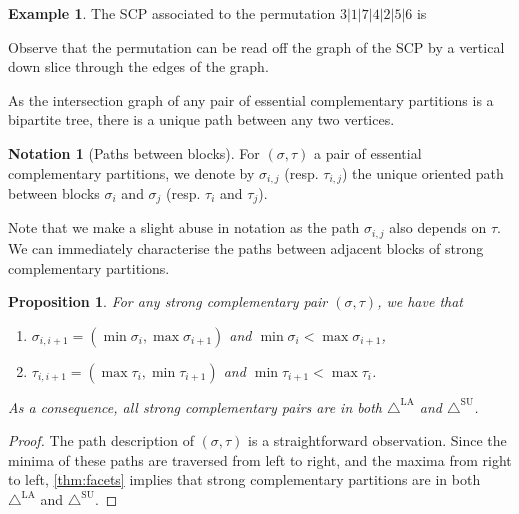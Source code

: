\documentclass{amsart}
\newtheorem{proposition}[theorem]{Proposition}
\theoremstyle{definition}
\newtheorem{example}[theorem]{Example}
\newtheorem{notation}[theorem]{Notation}
\newcommand{\SUD}{\triangle^{\mathrm{SU}}}
\newcommand{\LAD}{\triangle^{\mathrm{LA}}}
\begin{document}
\begin{example}
\label{ex:strong-complementary}
The SCP associated to the permutation $3|1|7|4|2|5|6$ is
\begin{center}
\end{center}
Observe that the permutation can be read off the graph of the SCP by a vertical down slice through the edges of the graph.
\end{example}

As the intersection graph of any pair of essential complementary partitions is a bipartite tree, there is a unique path between any two vertices. 

\begin{notation}[Paths between blocks]
    For $(\sigma,\tau)$ a pair of essential complementary partitions, we denote by $\sigma_{i,j}$ (resp. $\tau_{i,j}$) the unique oriented path between blocks $\sigma_{i}$ and $\sigma_j$ (resp. $\tau_{i}$ and $\tau_j$).
\end{notation}
Note that we make a slight abuse in notation as the path $\sigma_{i,j}$ also depends on $\tau$.
We can immediately characterise the paths between adjacent blocks of strong complementary partitions.

\begin{proposition} 
\label{lem:SCP-path-desc}
For any strong complementary pair $(\sigma,\tau)$, we have that
\begin{enumerate}
    \item $ \sigma_{i,i+1} = ( \min \sigma_i, \max \sigma_{i+1} )$ and $\min \sigma_i< \max \sigma_{i+1}$, 
    \item $  \tau_{i,i+1} =  ( \max \tau_i, \min \tau_{i+1} )$ and $\min \tau_{i+1}< \max \tau_{i}$.
\end{enumerate}
As a consequence, all strong complementary pairs are in both $\LAD$ and $\SUD$.
\end{proposition}
\begin{proof}
The path description of $(\sigma,\tau)$ is a straightforward observation. 
Since the minima of these paths are traversed from left to right, and the maxima from right to left, \cref{thm:facets} implies that strong complementary partitions are in both $\LAD$ and $\SUD$.
\end{proof}
\end{document}
